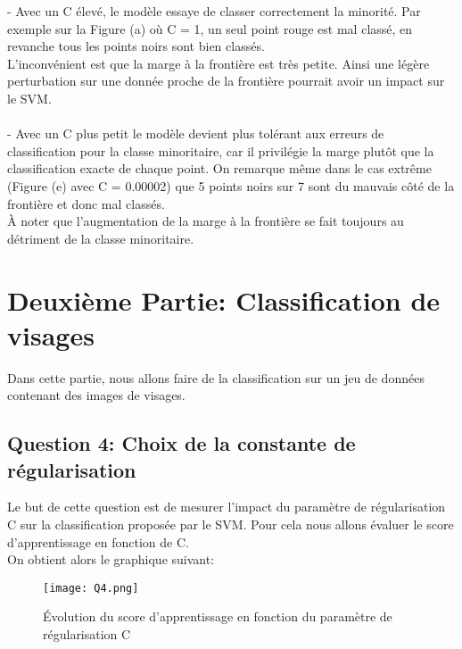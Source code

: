 \documentclass{article}
\begin{document}
- Avec un C élevé, le modèle essaye de classer correctement la minorité. Par exemple sur la Figure (a) où C = 1, un seul point rouge est mal classé, en revanche tous les points noirs sont bien classés.
\\ L'inconvénient est que la marge à la frontière est très petite. Ainsi une légère perturbation sur une donnée proche de la frontière pourrait avoir un impact sur le SVM.
\\
\\
- Avec un C plus petit le modèle devient plus tolérant aux erreurs de classification pour la classe  
minoritaire, car il privilégie la marge plutôt que la classification exacte de chaque point.
On remarque même dans le cas extrême (Figure (e) avec C = 0.00002) que 5 points noirs sur 7 sont 
du mauvais côté de la frontière et donc mal classés. 
\\À noter que l'augmentation de la marge
à la frontière se fait toujours au détriment de la classe minoritaire.


\section{Deuxième Partie: Classification de visages}

Dans cette partie, nous allons faire de la classification sur un jeu de données contenant des images de visages.

\subsection{Question 4: Choix de la constante de régularisation}

Le but de cette question est de mesurer l'impact du paramètre de régularisation C sur la classification proposée par le SVM. Pour cela nous allons évaluer le score d'apprentissage en fonction de C.
\\ On obtient alors le graphique suivant:

\begin{figure}[h]
    \centering
    \texttt{[image: Q4.png]}
    \caption{Évolution du score d'apprentissage en fonction du paramètre de régularisation C}
    \label{fig:enter-label}
\end{figure}
\end{document}
